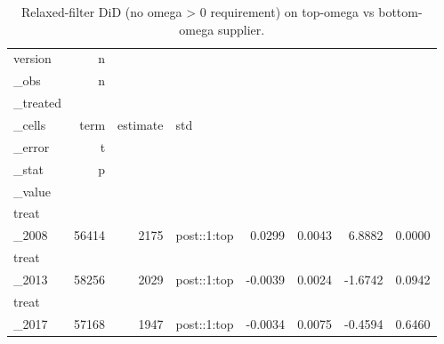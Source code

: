 \begin{table}[ht]
\centering
\caption{Relaxed-filter DiD (no omega > 0 requirement) on top-omega vs bottom-omega supplier.} 
\begin{tabular}{lrrlrrrr}
  \toprule
version & n\\_obs & n\\_treated\\_cells & term & estimate & std\\_error & t\\_stat & p\\_value \\ 
  \midrule
treat\\_2008 & 56414 &  2175 & post::1:top & 0.0299 & 0.0043 & 6.8882 & 0.0000 \\ 
  treat\\_2013 & 58256 &  2029 & post::1:top & -0.0039 & 0.0024 & -1.6742 & 0.0942 \\ 
  treat\\_2017 & 57168 &  1947 & post::1:top & -0.0034 & 0.0075 & -0.4594 & 0.6460 \\ 
   \bottomrule
\end{tabular}
\end{table}
